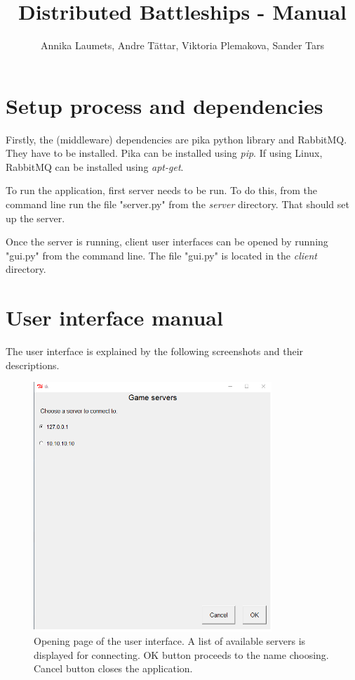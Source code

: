 \documentclass[]{article}
\title{Distributed Battleships - Manual}
\author{Annika Laumets, Andre Tättar, Viktoria Plemakova, Sander Tars}
\begin{document}
\lstset{language=Python}  

\maketitle

\section*{Setup process and dependencies}
Firstly, the (middleware) dependencies are pika python library and RabbitMQ. They have to be installed. Pika can be installed using \textit{pip}. If using Linux, RabbitMQ can be installed using \textit{apt-get}.

\noindent To run the application, first server needs to be run. To do this, from the command line run the file "server.py" from the \textit{server} directory. That should set up the server.

\noindent Once the server is running, client user interfaces can be opened by running "gui.py" from the command line. The file "gui.py" is located in the \textit{client} directory. 
\newpage

\section*{User interface manual}
The user interface is explained by the following screenshots and their descriptions.


\begin{figure}[!hbt]
	\centering
	\includegraphics[width=0.8\textwidth]{OpenPage.png}
	\caption{Opening page of the user interface. A list of available servers is displayed for connecting. OK button proceeds to the name choosing. Cancel button closes the application.}
	\label{fig:Openpage}
\end{figure}
\end{document}
